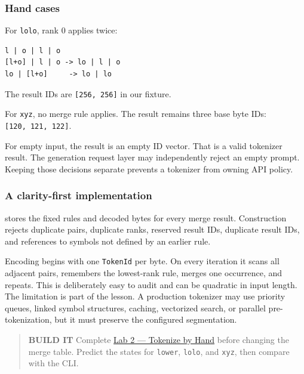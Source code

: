 \documentclass[
  10pt,
]{article}
\begin{document}
\subsubsection{Hand cases}\label{hand-cases}

For \texttt{lolo}, rank 0 applies twice:

\begin{verbatim}
l | o | l | o
[l+o] | l | o -> lo | l | o
lo | [l+o]     -> lo | lo
\end{verbatim}

The result IDs are \texttt{{[}256,\ 256{]}} in our fixture.

For \texttt{xyz}, no merge rule applies. The result remains three base
byte IDs: \texttt{{[}120,\ 121,\ 122{]}}.

For empty input, the result is an empty ID vector. That is a valid
tokenizer result. The generation request layer may independently reject
an empty prompt. Keeping those decisions separate prevents a tokenizer
from owning API policy.

\subsubsection{A clarity-first
implementation}\label{a-clarity-first-implementation}

\texttt{} stores the fixed rules and decoded
bytes for every merge result. Construction rejects duplicate pairs,
duplicate ranks, reserved result IDs, duplicate result IDs, and
references to symbols not defined by an earlier rule.

Encoding begins with one \texttt{TokenId} per byte. On every iteration
it scans all adjacent pairs, remembers the lowest-rank rule, merges one
occurrence, and repeats. This is deliberately easy to audit and can be
quadratic in input length. The limitation is part of the lesson. A
production tokenizer may use priority queues, linked symbol structures,
caching, vectorized search, or parallel pre-tokenization, but it must
preserve the configured segmentation.

\begin{quote}
\textbf{BUILD IT} Complete
\href{https://github.com/hermonai/inside-the-llm-engine/blob/astra-visual-rewrite/labs/lab-02-tokenize-by-hand.md}{Lab
2 --- Tokenize by Hand} before changing the merge table. Predict the
states for \texttt{lower}, \texttt{lolo}, and \texttt{xyz}, then compare
with the CLI.
\end{quote}
\end{document}
